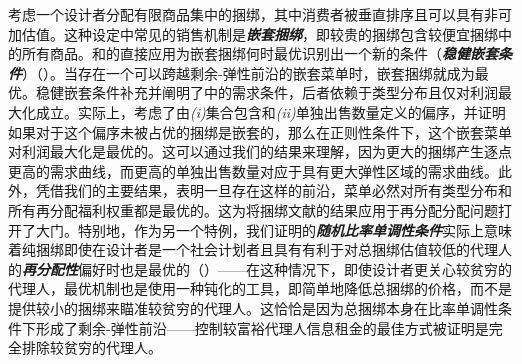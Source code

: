 \documentclass[12pt,letterpaper]{article}
\newenvironment{translation}{\color{blue}\noindent}{}
\theoremstyle{plain}
\theoremstyle{definition}
\theoremstyle{remark}
\renewcommand{\1}{\mathds{1}}
\theoremstyle{definition}
\begin{document}
\begin{translation}
考虑一个设计者分配有限商品集中的捆绑，其中消费者被垂直排序且可以具有非可加估值。这种设定中常见的销售机制是\textit{\textbf{嵌套捆绑}}，即较贵的捆绑包含较便宜捆绑中的所有商品。和的直接应用为嵌套捆绑何时最优识别出一个新的条件（\textit{\textbf{稳健嵌套条件}}）（）。当存在一个可以跨越剩余-弹性前沿的嵌套菜单时，嵌套捆绑就成为最优。稳健嵌套条件补充并阐明了\citet{yang2023nested}中的需求条件，后者依赖于类型分布且仅对利润最大化成立。实际上，\citet{yang2023nested}考虑了由\textit{(i)}集合包含和\textit{(ii)}单独出售数量定义的偏序，并证明如果对于这个偏序未被占优的捆绑是嵌套的，那么在正则性条件下，这个嵌套菜单对利润最大化是最优的。这可以通过我们的结果来理解，因为更大的捆绑产生逐点更高的需求曲线，而更高的单独出售数量对应于具有更大弹性区域的需求曲线。此外，凭借我们的主要结果，表明一旦存在这样的前沿，菜单必然对所有类型分布和所有再分配福利权重都是最优的。这为将捆绑文献的结果应用于再分配分配问题打开了大门。特别地，作为另一个特例，我们证明\citet{haghpanah2021pure}的\textit{\textbf{随机比率单调性条件}}实际上意味着纯捆绑即使在设计者是一个社会计划者且具有有利于对总捆绑估值较低的代理人的\textit{\textbf{再分配性}}偏好时也是最优的（）——在这种情况下，即使设计者更关心较贫穷的代理人，最优机制也是使用一种钝化的工具，即简单地降低总捆绑的价格，而不是提供较小的捆绑来瞄准较贫穷的代理人。这恰恰是因为总捆绑本身在比率单调性条件下形成了剩余-弹性前沿——控制较富裕代理人信息租金的最佳方式被证明是完全排除较贫穷的代理人。
\end{translation}
\end{document}
